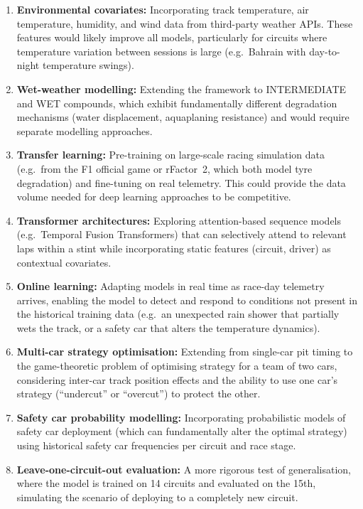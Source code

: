 \documentclass[journal,twoside]{IEEEtran}
\begin{document}
\begin{enumerate}
  \item \textbf{Environmental covariates:}  Incorporating track
  temperature, air temperature, humidity, and wind data from
  third-party weather APIs.  These features would likely improve all
  models, particularly for circuits where temperature variation between
  sessions is large (e.g.\ Bahrain with day-to-night temperature
  swings).

  \item \textbf{Wet-weather modelling:}  Extending the framework to
  INTERMEDIATE and WET compounds, which exhibit fundamentally different
  degradation mechanisms (water displacement, aquaplaning resistance) and
  would require separate modelling approaches.

  \item \textbf{Transfer learning:}  Pre-training on large-scale racing
  simulation data (e.g.\ from the F1 official game or rFactor~2, which
  both model tyre degradation) and fine-tuning on real telemetry.  This
  could provide the data volume needed for deep learning approaches to
  be competitive.

  \item \textbf{Transformer architectures:}  Exploring attention-based
  sequence models (e.g.\ Temporal Fusion Transformers) that can
  selectively attend to relevant laps within a stint while
  incorporating static features (circuit, driver) as contextual
  covariates.

  \item \textbf{Online learning:}  Adapting models in real time as
  race-day telemetry arrives, enabling the model to detect and respond to
  conditions not present in the historical training data (e.g.\ an
  unexpected rain shower that partially wets the track, or a
  safety car that alters the temperature dynamics).

  \item \textbf{Multi-car strategy optimisation:}  Extending from
  single-car pit timing to the game-theoretic problem of optimising
  strategy for a team of two cars, considering inter-car track
  position effects and the ability to use one car's strategy
  (``undercut'' or ``overcut'') to protect the other.

  \item \textbf{Safety car probability modelling:}  Incorporating
  probabilistic models of safety car deployment (which can
  fundamentally alter the optimal strategy) using historical safety
  car frequencies per circuit and race stage.

  \item \textbf{Leave-one-circuit-out evaluation:}  A more rigorous
  test of generalisation, where the model is trained on 14 circuits and
  evaluated on the 15th, simulating the scenario of deploying to a
  completely new circuit.
\end{enumerate}
\end{document}
